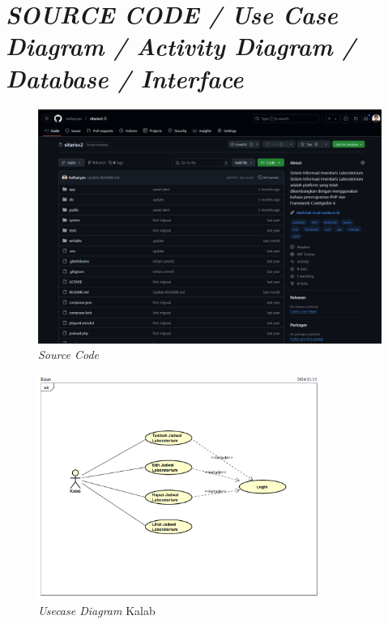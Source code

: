 %
%
%
%


\renewcommand{\thepage}{D - \arabic{page}}
\chapter{\textit{SOURCE CODE / Use Case Diagram / Activity Diagram / Database / Interface}}
\begin{figure}[h]
	\centering
	\includegraphics[width=0.82\linewidth]{konten/gambar/source-code.png}
	\caption{\textit{Source Code}}
	\label{fig:source-code}
\end{figure}

\begin{figure}
	\centering
	\includegraphics[width=0.82\textwidth]{konten/gambar/usecase-diagram/kalab.png}
	\caption{\textit{Usecase Diagram} Kalab}
	\label{usecase-diagram-kalab}
\end{figure}

